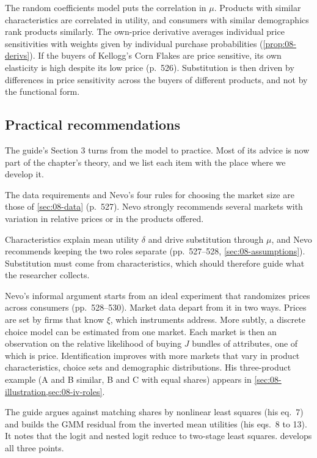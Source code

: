 The random coefficients model puts the correlation in $\mu$. Products with similar characteristics are
correlated in utility, and consumers with similar demographics rank products similarly. The own-price
derivative averages individual price sensitivities with weights given by individual purchase
probabilities (\cref{prop:08-derivs}). If the buyers of Kellogg's Corn Flakes are price sensitive, its
own elasticity is high despite its low price (p.~526). Substitution is then driven by differences in
price sensitivity across the buyers of different products, and not by the functional form.

\subsection{Practical recommendations}\label{sec:08-nevo00-practice}

The guide's Section 3 turns from the model to practice. Most of its advice is now part of the chapter's
theory, and we list each item with the place where we develop it.

The data requirements and Nevo's four rules for choosing the market size are those of \cref{sec:08-data}
(p.~527). Nevo strongly recommends several markets with variation in relative prices or in the products
offered.

Characteristics explain mean utility $\delta$ and drive substitution through $\mu$, and Nevo recommends keeping
the two roles separate (pp.~527--528, \cref{sec:08-assumptions}). Substitution must come from characteristics,
which should therefore guide what the researcher collects.

Nevo's informal argument starts from an ideal experiment that randomizes prices across consumers
(pp.~528--530). Market data depart from it in two ways. Prices are set by firms that know $\xi$, which
instruments address. More subtly, a discrete choice model can be estimated from one market. Each market
is then an observation on the relative likelihood of buying $J$ bundles of attributes, one of which is
price. Identification improves with more markets that vary in product characteristics, choice sets and
demographic distributions. His three-product example (A and B similar, B and C with equal shares) appears in
\cref{sec:08-illustration,sec:08-iv-roles}.

The guide argues against matching shares by nonlinear least squares (his eq.~7) and builds the GMM residual
from the inverted mean utilities (his eqs.~8 to 13). It notes that the logit and nested logit reduce to
two-stage least squares.  develops all three points.


